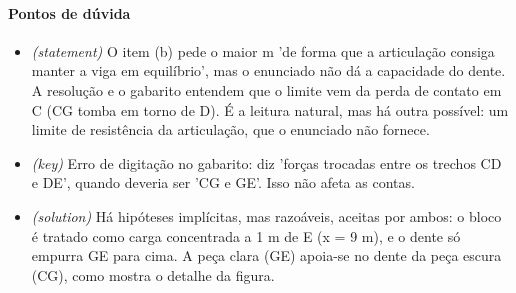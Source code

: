 \documentclass{article}%
\begin{document}
\paragraph{Pontos de dúvida}%
\begin{itemize}%
\item%
\textit{(statement)} O item (b) pede o maior m 'de forma que a articulação consiga manter a viga em equilíbrio', mas o enunciado não dá a capacidade do dente. A resolução e o gabarito entendem que o limite vem da perda de contato em C (CG tomba em torno de D). É a leitura natural, mas há outra possível: um limite de resistência da articulação, que o enunciado não fornece.%
\item%
\textit{(key)} Erro de digitação no gabarito: diz 'forças trocadas entre os trechos CD e DE', quando deveria ser 'CG e GE'. Isso não afeta as contas.%
\item%
\textit{(solution)} Há hipóteses implícitas, mas razoáveis, aceitas por ambos: o bloco é tratado como carga concentrada a 1 m de E (x = 9 m), e o dente só empurra GE para cima. A peça clara (GE) apoia{-}se no dente da peça escura (CG), como mostra o detalhe da figura.%
\end{itemize}%
\end{document}
